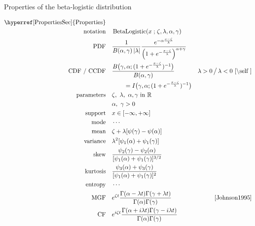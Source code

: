 

\begin{table*}[p]
\caption[Beta-logistic distribution -- Properties]{Properties of the beta-logistic distribution}
\begin{align*}
\text{\hyperref[PropertiesSec]{Properties}}  \quad& \\
\text{notation} \quad &  \op{BetaLogistic}(x\given \pLoc,\pScale,\alpha,\gamma)  
\checked
\\
\text{PDF}\quad &  
\frac{1}{B(\alpha, \gamma) \left| \pScale\right|}
 \frac{e^{-\alpha \frac{x-\pLoc}{\pScale} }} { \left(1 + e^{-\frac{x-\pLoc}{\pScale}  }\right)^{\alpha+\gamma} }
\checked 
\\
\text{CDF / CCDF} \quad  &  
 \frac{B\big(\gamma, \alpha ;  ( 1+e^{-\frac{x-\pLoc}{\pScale}} )^{-1}  \big) }{B(\alpha,\gamma)}
& \pScale>0 \, \big/ \, \pScale<0 \checked
 \text{ \cite{\self}} \\
& \qquad  = I\big(  \gamma, \alpha;  ( 1+e^{-\frac{x-\pLoc}{\pScale}} )^{-1}  \big) \checked
\\
\text{parameters}\quad &   \pLoc,\ \pScale,\ \alpha, \gamma  \text{ in } \mathbb{R} \checked \\
& \alpha,\ \gamma >0 \checked
\\
\text{support} \quad &   x \in [-\infty,+\infty] \checked
\\
\text{mode} \quad  & \cdots
\\
\text{mean} \quad  &  \pLoc +\pScale [ \psi(\gamma)-\psi(\alpha) ]  \checked %
\\
\text{variance} \quad  & \pScale^2 [\psi_1(\alpha) + \psi_1(\gamma) ] \checked %
\\
\text{skew} \quad  &  \frac{ \psi_2(\gamma) - \psi_2(\alpha)}{[\psi_1(\alpha) + \psi_1(\gamma)]^{3/2}} \checked
\\
\text{kurtosis} \quad  &   \frac{\psi_3(\alpha) + \psi_3(\gamma)}{[\psi_1(\alpha) + \psi_1(\gamma)]^{2}} \checked
\\
\text{entropy} \quad  & \cdots
\\
\text{MGF} \quad  &  e^{ \pLoc t}\frac{\Gamma(\alpha-\pScale  t) \Gamma(\gamma+\pScale t)}{\Gamma(\alpha)\Gamma(\gamma)}
& \text{\cite{Johnson1995}} \checked
\\
\text{CF} \quad  &    e^{i \pLoc t} \frac{\Gamma(\alpha+ i \pScale  t) \Gamma(\gamma-i \pScale t)}{\Gamma(\alpha)\Gamma(\gamma)} \checked
\end{align*}
\end{table*}

